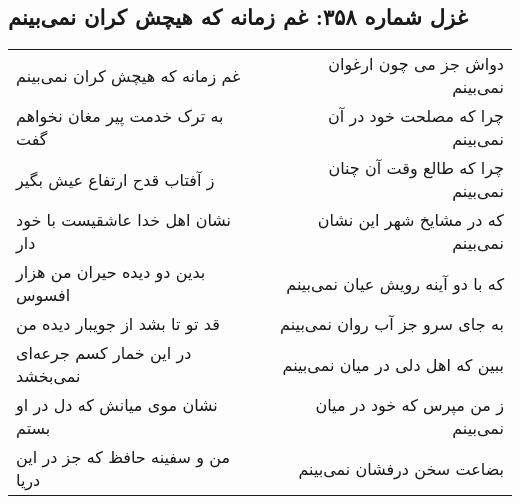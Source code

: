 \begin{center}
\section*{غزل شماره ۳۵۸: غم زمانه که هیچش کران نمی‌بینم}
\label{sec:sh358}
\begin{longtable}{l p{0.5cm} r}
غم زمانه که هیچش کران نمی‌بینم
&&
دواش جز می چون ارغوان نمی‌بینم
\\
به ترک خدمت پیر مغان نخواهم گفت
&&
چرا که مصلحت خود در آن نمی‌بینم
\\
ز آفتاب قدح ارتفاع عیش بگیر
&&
چرا که طالع وقت آن چنان نمی‌بینم
\\
نشان اهل خدا عاشقیست با خود دار
&&
که در مشایخ شهر این نشان نمی‌بینم
\\
بدین دو دیده حیران من هزار افسوس
&&
که با دو آینه رویش عیان نمی‌بینم
\\
قد تو تا بشد از جویبار دیده من
&&
به جای سرو جز آب روان نمی‌بینم
\\
در این خمار کسم جرعه‌ای نمی‌بخشد
&&
ببین که اهل دلی در میان نمی‌بینم
\\
نشان موی میانش که دل در او بستم
&&
ز من مپرس که خود در میان نمی‌بینم
\\
من و سفینه حافظ که جز در این دریا
&&
بضاعت سخن درفشان نمی‌بینم
\\
\end{longtable}
\end{center}
